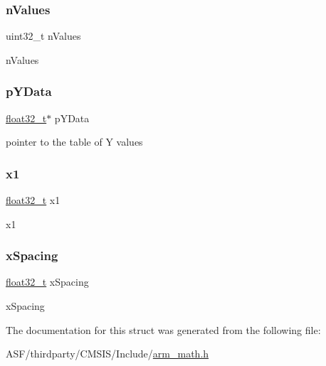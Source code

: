 \subsubsection{\texorpdfstring{nValues}{nValues}}
{\footnotesize\ttfamily uint32\+\_\+t n\+Values}

n\+Values \mbox{\label{structarm__linear__interp__instance__f32_af1489866b69eb5db1e0afeb24c7b01e9}} 
\subsubsection{\texorpdfstring{pYData}{pYData}}
{\footnotesize\ttfamily \mbox{\hyperlink{arm__math_8h_a4611b605e45ab401f02cab15c5e38715}{float32\+\_\+t}}$\ast$ p\+Y\+Data}

pointer to the table of Y values \mbox{\label{structarm__linear__interp__instance__f32_a795ed79ea4c18d52afe5eb5e868e1c5a}} 
\subsubsection{\texorpdfstring{x1}{x1}}
{\footnotesize\ttfamily \mbox{\hyperlink{arm__math_8h_a4611b605e45ab401f02cab15c5e38715}{float32\+\_\+t}} x1}

x1 \mbox{\label{structarm__linear__interp__instance__f32_a08675584bb57fc42bbb3739c13674346}} 
\subsubsection{\texorpdfstring{xSpacing}{xSpacing}}
{\footnotesize\ttfamily \mbox{\hyperlink{arm__math_8h_a4611b605e45ab401f02cab15c5e38715}{float32\+\_\+t}} x\+Spacing}

x\+Spacing 

The documentation for this struct was generated from the following file\+:\begin{DoxyCompactItemize}
\item 
A\+S\+F/thirdparty/\+C\+M\+S\+I\+S/\+Include/\mbox{\hyperlink{arm__math_8h}{arm\+\_\+math.\+h}}\end{DoxyCompactItemize}
